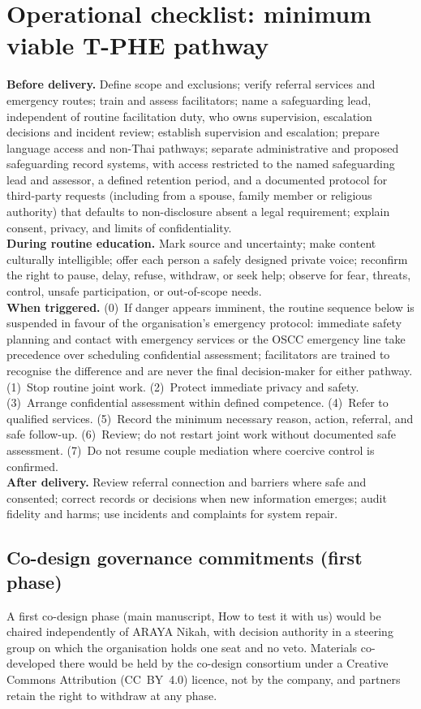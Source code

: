 \documentclass[11pt]{article}
\newcommand{\tphe}{T\mbox{-}PHE}
\begin{document}
\section{Operational checklist: minimum viable \tphe{} pathway}
\label{sec:S4}
\footnotesize
\textbf{Before delivery.} Define scope and exclusions; verify referral services and emergency routes; train and assess facilitators; name a safeguarding lead, independent of routine facilitation duty, who owns supervision, escalation decisions and incident review; establish supervision and escalation; prepare language access and non-Thai pathways; separate administrative and proposed safeguarding record systems, with access restricted to the named safeguarding lead and assessor, a defined retention period, and a documented protocol for third-party requests (including from a spouse, family member or religious authority) that defaults to non-disclosure absent a legal requirement; explain consent, privacy, and limits of confidentiality.\\
\textbf{During routine education.} Mark source and uncertainty; make content culturally intelligible; offer each person a safely designed private voice; reconfirm the right to pause, delay, refuse, withdraw, or seek help; observe for fear, threats, control, unsafe participation, or out-of-scope needs.\\
\textbf{When triggered.} (0)~If danger appears imminent, the routine sequence below is suspended in favour of the organisation's emergency protocol: immediate safety planning and contact with emergency services or the OSCC emergency line take precedence over scheduling confidential assessment; facilitators are trained to recognise the difference and are never the final decision-maker for either pathway. (1)~Stop routine joint work. (2)~Protect immediate privacy and safety. (3)~Arrange confidential assessment within defined competence. (4)~Refer to qualified services. (5)~Record the minimum necessary reason, action, referral, and safe follow-up. (6)~Review; do not restart joint work without documented safe assessment. (7)~Do not resume couple mediation where coercive control is confirmed.\\
\textbf{After delivery.} Review referral connection and barriers where safe and consented; correct records or decisions when new information emerges; audit fidelity and harms; use incidents and complaints for system repair.

\subsection{Co-design governance commitments (first phase)}
A first co-design phase (main manuscript, How to test it with us) would be chaired independently of ARAYA Nikah, with decision authority in a steering group on which the organisation holds one seat and no veto. Materials co-developed there would be held by the co-design consortium under a Creative Commons Attribution (CC~BY~4.0) licence, not by the company, and partners retain the right to withdraw at any phase.
\end{document}
